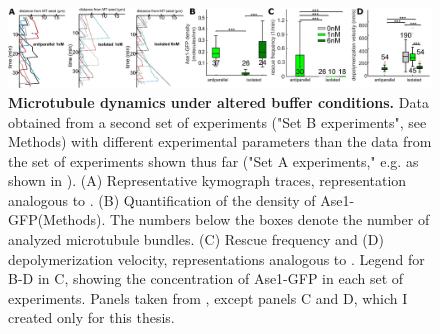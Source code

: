 \begin{figure}[h]
    \centering
    \includegraphics[width=1\linewidth]{Figures/ase1_1e.png}
    \caption[Microtubule dynamics under altered buffer conditions.]{
    \textbf{Microtubule dynamics under altered buffer conditions.} Data obtained from a second set of experiments ("Set B experiments", see Methods) with different experimental parameters than the data from the set of experiments shown thus far ("Set A experiments," e.g. as shown in ). (A) Representative kymograph traces, representation analogous to . (B) Quantification of the density of Ase1-GFP(Methods). The numbers below the boxes denote the number of analyzed microtubule bundles. (C) Rescue frequency and (D) depolymerization velocity, representations analogous to . Legend for B-D in C, showing the concentration of Ase1-GFP in each set of experiments. Panels taken from \cite{Krattenmacher2024}, except panels C and D, which I created only for this thesis.
        }\label{ase1e}
\end{figure}

\FloatBarrier
